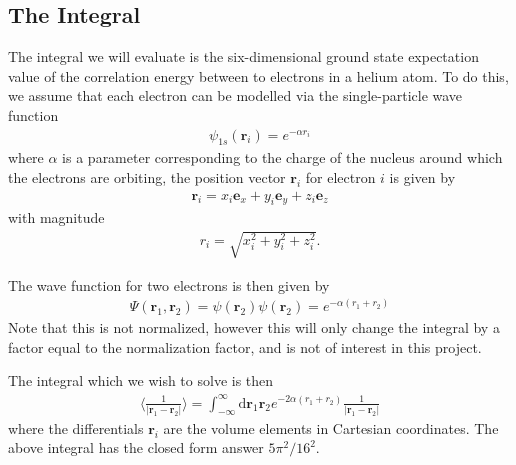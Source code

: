 \documentclass[twoside, 11pt]{article}
\renewcommand{\d}{\mathrm{d}}
\begin{document}
	\subsection{The Integral}
		The integral we will evaluate is the six-dimensional ground state expectation value of the correlation energy between to electrons in a helium atom. To do this, we assume that each electron can be modelled via the single-particle wave function
		\begin{align}
			\psi_{1s} (\mathbf{r}_i) = e^{-\alpha r_i}
		\end{align}
		where $\alpha$ is a parameter corresponding to the charge of the nucleus around which the electrons are orbiting, the position vector $\mathbf{r}_i$ for electron $i$ is given by
		\begin{align}
			\mathbf{r}_i = x_i \mathbf{e}_x + y_i \mathbf{e}_y + z_i \mathbf{e}_z
		\end{align}
		with magnitude
		\begin{align}
			r_i = \sqrt{x_i^2 + y_i^2 + z_i^2}.
		\end{align}
		
		The wave function for two electrons is then given by
		\begin{align}
			\Psi(\mathbf{r}_1, \mathbf{r}_2) = \psi(\mathbf{r}_2)\psi(\mathbf{r}_2) = e^{-\alpha(r_1 + r_2)}
		\end{align}
		Note that this is not normalized, however this will only change the integral by a factor equal to the normalization factor, and is not of interest in this project.
		
		The integral which we wish to solve is then
		\begin{align}
			\langle \frac{1}{|\mathbf{r}_1 - \mathbf{r}_2|} \rangle = \int_{-\infty}^{\infty} \d\mathbf{r}_1 \mathbf{r}_2 e^{-2\alpha(r_1+r_2)} \frac{1}{|\mathbf{r}_1 - \mathbf{r}_2|} \label{eq: unchanged integral}
		\end{align}
		where the differentials $\mathbf{r}_i$ are the volume elements in Cartesian coordinates. The above integral has the closed form answer $5\pi^2/16^2$.
		
\end{document}

